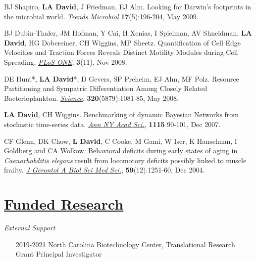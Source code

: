 \documentclass[overlapped,line,11pt]{res}
\begin{document}
\begin{resume}
\begin{revnumerate}[29]
\vspace*{1mm}
\item {BJ Shapiro, \textbf{LA David}, J Friedman, EJ Alm. Looking for
Darwin's footprints in the microbial world.  \emph{\underline{Trends Microbiol}}
\textbf{17}(5):196-204, May 2009.}

\vspace*{1mm}
\item { BJ Dubin-Thaler, JM Hofman, Y Cai, H Xenias, I Spielman, AV
  Shneidman, \textbf{LA David}, HG Dobereiner, CH Wiggins, MP Sheetz.
  Quantification of Cell Edge Velocities and Traction Forces Reveals
  Distinct Motility Modules during Cell Spreading. \emph{\underline{PLoS ONE}},
  \textbf{3}(11), Nov 2008.}

\vspace*{1mm}
\item {DE Hunt*, \textbf{LA David}*, D Gevers, SP Preheim, EJ Alm, MF
Polz.  Resource Partitioning and Sympatric Differentiation Among
Closely Related Bacterioplankton.  \emph{\underline{Science}},
\textbf{320}(5879):1081-85, May 2008.}

\vspace*{1mm}
\item {\textbf{LA David}, CH Wiggins. Benchmarking of dynamic Bayesian
  Networks from stochastic time-series data. \emph{\underline{Ann NY Acad Sci.}},
  \textbf{1115} 90-101, Dec 2007.}

\vspace*{1mm}
\item {CF Glenn, DK Chow, \textbf{L David}, C Cooke, M Gami, W Iser, K
  Hanselman, I Goldberg and CA Wolkow. Behavioral deficits during
  early states of aging in {\em Caenorhabditis elegans} result from
  locomotory deficits possibly linked to muscle frailty. \emph{\underline{J
    Gerontol A Biol Sci Med Sci.}}, \textbf{59}(12):1251-60, Dec 2004.}
\end{revnumerate}

\section{\underline{\sc Funded Research}} 
\vspace{.1in}
\emph{External Support}
\vspace{.1in}

\begin{itemize}[leftmargin=2cm, style=sameline]

\item[2019-2021] North Carolina Biotechnology Center, Translational
  Research Grant
  \newline Principal Investigator


\end{itemize}
\end{resume}
\end{document}
